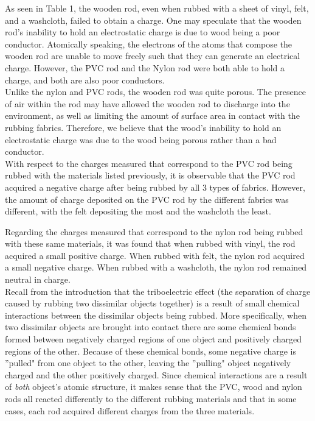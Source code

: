 \documentclass[oneside,12pt]{amsart}
\begin{document}
\indent As seen in Table 1, the wooden rod, even when rubbed with a sheet of vinyl, felt, and a washcloth, failed to obtain a charge. One may speculate that the wooden rod's inability to hold an electrostatic charge is due to wood being a poor conductor. Atomically speaking, the electrons of the atoms that compose the wooden rod are unable to move freely such that they can generate an electrical charge. However, the PVC rod and the Nylon rod were both able to hold a charge, and both are also poor conductors.\\
\indent Unlike the nylon and PVC rods, the wooden rod was quite porous. The presence of air within the rod may have allowed the wooden rod to discharge into the environment, as well as limiting the amount of surface area in contact with the rubbing fabrics. Therefore, we believe that the wood's inability to hold an electrostatic charge was due to the wood being porous rather than a bad conductor.\\

\indent With respect to the charges measured that correspond to the PVC rod being rubbed with the materials listed previously, it is observable that the PVC rod acquired a negative charge after being rubbed by all 3 types of fabrics. However, the amount of charge deposited on the PVC rod by the different fabrics was different, with the felt depositing the most and the washcloth the least.
 
\indent Regarding the charges measured that correspond to the nylon rod being rubbed with these same materials, it was found that when rubbed with vinyl, the rod acquired a small positive charge. When rubbed with felt, the nylon rod acquired a small negative charge. When rubbed with a washcloth, the nylon rod remained neutral in charge.\\

\indent Recall from the introduction that the triboelectric effect (the separation of charge caused by rubbing two dissimilar objects together) is a result of small chemical interactions between the dissimilar objects being rubbed. More specifically, when two dissimilar objects are brought into contact there are some chemical bonds formed between negatively charged regions of one object and positively charged regions of the other. Because of these chemical bonds, some negative charge is ''pulled" from one object to the other, leaving the ''pulling" object negatively charged and the other positively charged. Since chemical interactions are a result of \textit{both} object's atomic structure, it makes sense that the PVC, wood and nylon rods all reacted differently to the different rubbing materials and that in some cases, each rod acquired different charges from the three materials.\\
\end{document}
